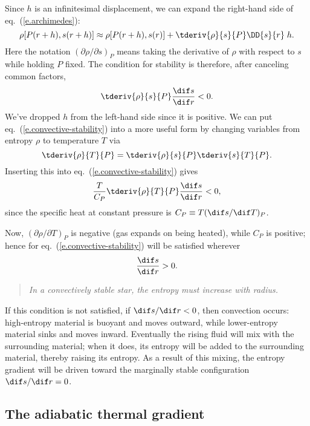 Since $h$ is an infinitesimal displacement, we can expand the right-hand side of eq.~(\ref{e.archimedes}):
\[
	\rho[P(r+h),s(r+h)] \approx \rho[P(r+h),s(r)] + \tderiv{\rho}{s}{P}\DD{s}{r}\;h.
\]
Here the notation $(\partial \rho/\partial s)_{P}$ means taking the derivative of $\rho$ with respect to $s$ while holding $P$ fixed. The condition for stability is therefore, after canceling common factors,
\begin{equation}\label{e.convective-stability}
 \tderiv{\rho}{s}{P}\frac{\dif s}{\dif r}< 0 .
\end{equation}
We've dropped $h$ from the left-hand side since it is positive.
We can put eq.~(\ref{e.convective-stability}) into a more useful form by changing variables from entropy $\rho$ to temperature $T$ via
\[
\tderiv{\rho}{T}{P} = \tderiv{\rho}{s}{P}\tderiv{s}{T}{P}.
\]
Inserting this into eq.~(\ref{e.convective-stability}) gives
\[
 \frac{T}{C_{P}}\tderiv{\rho}{T}{P}\frac{\dif s}{\dif r} < 0,
\]
since the specific heat at constant pressure is $C_{P}\equiv T(\dif s/\dif T)_{P}$. 

Now, $(\partial \rho/\partial T)_{P}$ is negative (gas expands on being heated), while $C_{P}$ is positive; hence for eq.~(\ref{e.convective-stability}) will be satisfied wherever
\begin{equation}\label{e.entropy-condition}
\frac{\dif s}{\dif r} > 0.
\end{equation}
\begin{quote}\itshape
In a convectively stable star, the entropy must increase with radius.
\end{quote}
If this condition is not satisfied, if $\dif s/\dif r < 0$, then convection occurs: high-entropy material is buoyant and moves outward, while lower-entropy material sinks and moves inward. Eventually the rising fluid will mix with the surrounding material; when it does, its entropy will be added to the surrounding material, thereby raising its entropy. As a result of this mixing, the entropy gradient will be driven toward the marginally stable configuration $\dif s/\dif r = 0$.

\subsection{The adiabatic thermal gradient}\label{s.adiabatic-gradient}


